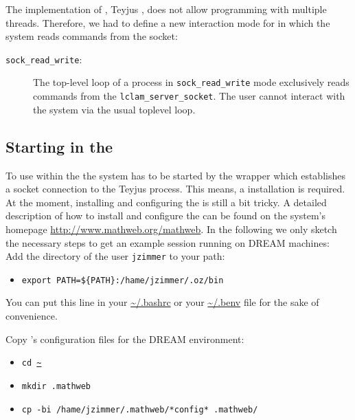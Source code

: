 The implementation of {\lclam}, Teyjus {\lprolog}, does not allow
programming with multiple threads. Therefore, we had to define a new
interaction mode for {\lclam} in which the system reads commands from
the {\mathwebsb} socket:
\begin{description}
\item[{\tt sock\_read\_write}:] The top-level loop of a {\lclam}
  process in {\tt sock\_read\_write} mode exclusively reads commands
  from the {\tt lclam\_server\_socket}. The user cannot interact with
  the system via the usual toplevel loop.
\end{description}

\subsection{Starting {\lclam} in the {\mathwebsb}}
To use {\lclam} within the {\mathwebsb} the system has to be
started by the {\lclam} {\mathweb} wrapper which establishes a socket
connection to the Teyjus process. This means, a {\mathwebsb}
installation is required.  At the moment, installing and configuring
the {\mathwebsb} is still a bit tricky. A detailed description of how
to install and configure the {\mathwebsb} can be found on the system's
homepage \url{http://www.mathweb.org/mathweb}. In the following we
only sketch the necessary steps to get an example session running on
DREAM machines:\\

\noindent Add the {\mozart} directory of the user {\tt jzimmer} to your path:
\begin{itemize}
\item {\tt export  PATH=\$\{PATH\}:/hame/jzimmer/.oz/bin}
\end{itemize}
You can put this line in your \url{~/.bashrc} or your \url{~/.benv} file for the sake of convenience.

\noindent Copy {\mathwebsb}'s configuration files for the DREAM environment:
\begin{itemize}
\item {\tt cd \url{~}}
\item {\tt mkdir .mathweb}
\item {\tt cp -bi /hame/jzimmer/.mathweb/*config* .mathweb/}
\end{itemize}

